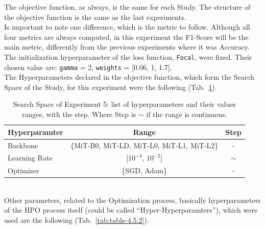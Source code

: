 The objective function, as always, is the same for each Study. The structure of the objective function is the same as the last experiments.
\\[0.3cm]Is important to note one difference, which is the metric to follow. Although all four metrics are always computed, in this experiment the F1-Score will be the main metric, differently from the previous experiments where it was Accuracy.
\\[0.3cm]The initialization hyperparameter of the loss function, \texttt{Focal}, were fixed. Their chosen value are: \texttt{gamma} = 2, \texttt{weights} = [0.06, 1, 1.7].
% 
\\[0.3cm]The Hyperparameters declared in the objective function, which form the Search Space of the Study, for this experiment were the following (Tab.~\ref{tab:table-4.5.1}).
\begin{table}[ht!]
	\center
	\setlength{\tabcolsep}{0.5cm}
	\caption[Search Space of Experiment 5]{Search Space of Experiment 5: list of hyperparameters and their values ranges, with the step. Where Step is $\sim$ if the range is continuous.}
	\begin{tabular}{@{}lcc@{}}
		\toprule
		\textbf{Hyperparamter} & \textbf{Range}                             & \textbf{Step} \\ \midrule
		Backbone               & \{MiT-B0, MiT-LD, MiT-L0, MiT-L1, MiT-L2\} & -             \\[0.1cm]
		Learning Rate          & {[}$10^{-4}$, $10^{-2}${]}                 & $\sim$        \\[0.1cm]
		Optimizer              & \{SGD, Adam\}                              & -             \\ \bottomrule
	\end{tabular}
	\label{tab:table-4.5.1}
\end{table}
% 
\\[0.3cm]Other parameters, related to the Optimization process, basically hyperparameters of the HPO process itself (could be called “Hyper-Hyperparamters”), which were used are the following (Tab.~\ref{tab:table-4.5.2}).
